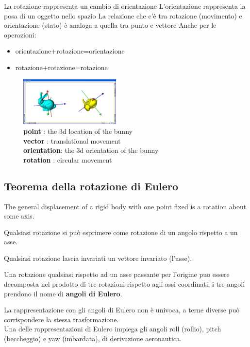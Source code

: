 \documentclass[a4paper, 10pt]{article}
\begin{document}
		\noindent
		La rotazione rappresenta un cambio di orientazione
		L'orientazione rappresenta la posa di un oggetto nello spazio
		La relazione che c'è tra rotazione (movimento) e orientazione
		(stato) è analoga a quella tra punto e vettore
		Anche per le operazioni:
		\begin{itemize}
			\item orientazione+rotazione=orientazione
			\item rotazione+rotazione=rotazione
		\end{itemize}
		
		\begin{figure}
			\includegraphics[width=0.45\textwidth]{bunny}
			\caption*{
				\textbf{point} : the 3d location of the bunny \\
				\textbf{vector} : translational movement\\
				\textbf{orientation}: the 3d orientation of the bunny\\
				\textbf{rotation} : circular movement
			}
		\end{figure}
		
	\subsection{Teorema della rotazione di Eulero}
		The general displacement of a rigid body with
		one point fixed is a rotation about some axis.
		
		\noindent
		Qualsiasi rotazione si può esprimere come rotazione di un
		angolo rispetto a un asse.
		
		\noindent
		Qualsiasi rotazione lascia invariati un vettore invariato (l'asse).
		
		\noindent
		Una rotazione qualsiasi rispetto ad un asse passante per
		l'origine puo essere decomposta nel prodotto di tre rotazioni
		rispetto agli assi coordinati; i tre angoli prendono il nome di
		\textbf{angoli di Eulero}.
		
		\noindent
		La rappresentazione con gli angoli di Eulero non è univoca, a
		terne diverse può corrispondere la stessa trasformazione.\\
		Una delle rappresentazioni di Eulero impiega gli angoli roll (rollio),
		pitch (beccheggio) e yaw (imbardata), di derivazione aeronautica.
		
\end{document}
